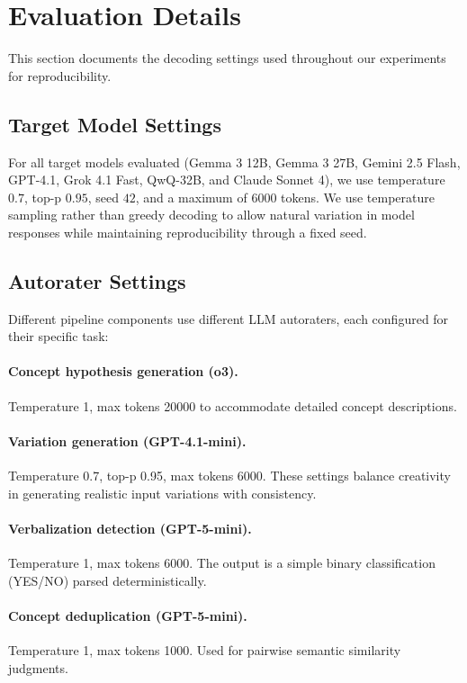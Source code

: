 \section{Evaluation Details}\label{appsec:eval-details}

This section documents the decoding settings used throughout our experiments for reproducibility.

\subsection{Target Model Settings}

For all target models evaluated (Gemma 3 12B, Gemma 3 27B, Gemini 2.5 Flash, GPT-4.1, Grok 4.1 Fast, QwQ-32B, and Claude Sonnet 4), we use temperature \(0.7\), top-p \(0.95\), seed \(42\), and a maximum of \(6000\) tokens.
We use temperature sampling rather than greedy decoding to allow natural variation in model responses while maintaining reproducibility through a fixed seed.

\subsection{Autorater Settings}

Different pipeline components use different LLM autoraters, each configured for their specific task:

\paragraph{Concept hypothesis generation (o3).} Temperature 1, max tokens 20000 to accommodate detailed concept descriptions.

\paragraph{Variation generation (GPT-4.1-mini).} Temperature 0.7, top-p 0.95, max tokens 6000. These settings balance creativity in generating realistic input variations with consistency.

\paragraph{Verbalization detection (GPT-5-mini).} Temperature 1, max tokens 6000. The output is a simple binary classification (YES/NO) parsed deterministically.

\paragraph{Concept deduplication (GPT-5-mini).} Temperature 1, max tokens 1000. Used for pairwise semantic similarity judgments.

